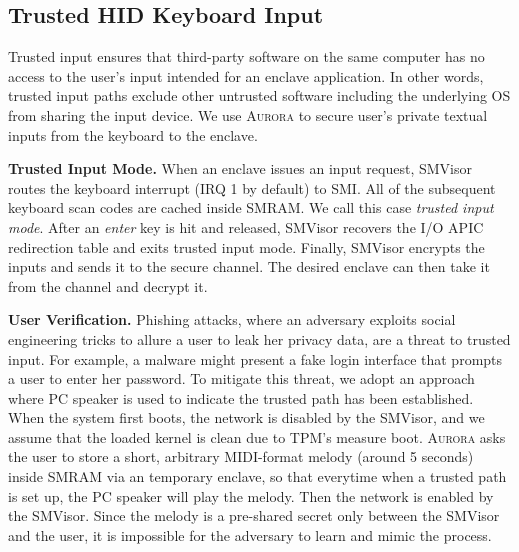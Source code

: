 \subsection{Trusted HID Keyboard Input}\label{input_service}
Trusted input ensures that third-party software on the same computer has no access to the user's input intended for an enclave application. In other words, trusted input paths exclude other untrusted software including the underlying OS from sharing the input device. We use \textsc{Aurora} to secure user's private textual inputs from the keyboard to the enclave.%

\textbf{Trusted Input Mode.}
When an enclave issues an input request, SMVisor routes the keyboard interrupt (IRQ 1 by default) to SMI. All of the subsequent keyboard scan codes are cached inside SMRAM. We call this case \emph{trusted input mode}. After an \emph{enter} key is hit and released, SMVisor recovers the I/O APIC redirection table and exits trusted input mode. Finally, SMVisor encrypts the inputs and sends it to the secure channel. The desired enclave can then take it from the channel and decrypt it. %

\textbf{User Verification.}
Phishing attacks, where an adversary exploits social engineering tricks to allure a user to leak her privacy data, are a threat to trusted input. For example, a malware might present a fake login interface that prompts a user to enter her password.
To mitigate this threat, we adopt an approach where PC speaker is used to indicate the trusted path has been established.
When the system first boots, the network is disabled by the SMVisor, and we assume that the loaded kernel is clean due to TPM's measure boot. \textsc{Aurora} asks the user to store a short, arbitrary MIDI-format melody (around 5 seconds) inside SMRAM via an temporary enclave, so that everytime when a trusted path is set up, the PC speaker will play the melody. Then the network is enabled by the SMVisor. Since the melody is a pre-shared secret only between the SMVisor and the user, it is impossible for the adversary to learn and mimic the process.

